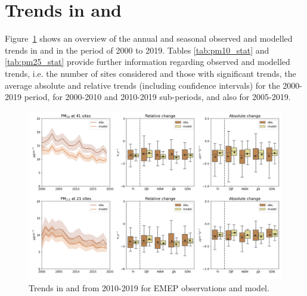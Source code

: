\section{\label{sec:Trends_PM }Trends in \PM[10] and \PM[2.5] }

Figure~\ref{fig:pm_trends} shows an overview of the annual and seasonal observed and modelled trends in \PM[10] and \PM[2.5] in the period of 2000 to 2019. Tables \ref{tab:pm10_stat} and \ref{tab:pm25_stat} provide further information regarding observed and modelled trends, i.e. the number of sites considered and those with significant trends, the average absolute and relative trends (including confidence intervals) for the 2000-2019 period, for 2000-2010 and 2010-2019 sub-periods, and also for 2005-2019.


\begin{figure}
	\centering
	\includegraphics[width=0.74\paperwidth]{FIGS_TRENDS/PM_trends.png}
	\caption{\label{fig:pm_trends}Trends in \PM[10]  and \PM[2.5] from 2010-2019 for EMEP observations and model.}
\end{figure}



